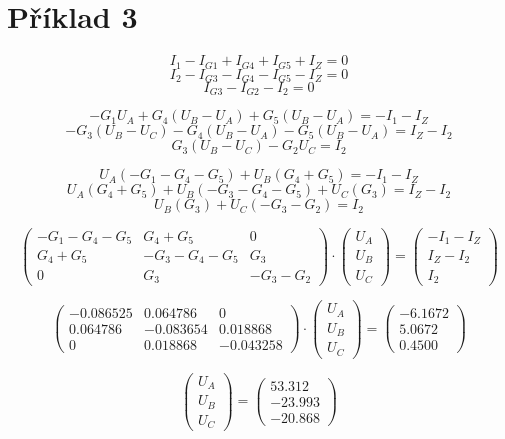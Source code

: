 \section{Příklad 3}

$$
  I_1 - I_{G1} + I_{G4} + I_{G5} + I_Z = 0
$$
$$
  I_2 - I_{G3} - I_{G4} - I_{G5} - I_Z = 0
$$
$$
  I_{G3} - I_{G2} - I_2 = 0
$$

$$
  -G_1 U_A + G_4 (U_B - U_A) + G_5 (U_B - U_A) = -I_1 - I_Z
$$
$$
  -G_3 (U_B - U_C) - G_4 (U_B - U_A) - G_5 (U_B - U_A) = I_Z - I_2
$$
$$
  G_3 (U_B - U_C) - G_2 U_C = I_2
$$

$$
  U_A (-G_1 - G_4 - G_5) + U_B (G_4 + G_5) = -I_1 - I_Z
$$
$$
  U_A (G_4 + G_5) + U_B (-G_3 - G_4 -G_5) + U_C (G_3) = I_Z - I_2
$$
$$
  U_B (G_3) + U_C (-G_3 - G_2) = I_2
$$

$$
  \begin{pmatrix}
    -G_1-G_4-G_5 & G_4+G_5      & 0        \\
    G_4+G_5      & -G_3-G_4-G_5 & G_3      \\
    0            & G_3          & -G_3-G_2
  \end{pmatrix}
  \cdot
  \begin{pmatrix}
    U_A \\
    U_B \\
    U_C
  \end{pmatrix}
  =
  \begin{pmatrix}
    -I_1-I_Z \\
    I_Z-I_2  \\
    I_2
  \end{pmatrix}
$$

$$
  \begin{pmatrix}
    -0.086525 & 0.064786  & 0         \\
    0.064786  & -0.083654 & 0.018868  \\
    0         & 0.018868  & -0.043258
  \end{pmatrix}
  \cdot
  \begin{pmatrix}
    U_A \\
    U_B \\
    U_C
  \end{pmatrix}
  =
  \begin{pmatrix}
    -6.1672 \\
    5.0672  \\
    0.4500
  \end{pmatrix}
$$

$$
  \begin{pmatrix}
    U_A \\
    U_B \\
    U_C
  \end{pmatrix}
  =
  \begin{pmatrix}
    53.312  \\
    -23.993 \\
    -20.868
  \end{pmatrix}
$$
